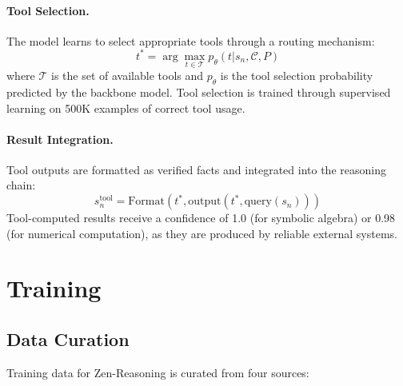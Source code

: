 \documentclass[11pt,a4paper]{article}
\begin{document}
\paragraph{Tool Selection.} The model learns to select appropriate tools through a routing mechanism:
\begin{equation}
    t^* = \arg\max_{t \in \mathcal{T}} p_\theta(t | s_n, \mathcal{C}, P)
\end{equation}
where $\mathcal{T}$ is the set of available tools and $p_\theta$ is the tool selection probability predicted by the backbone model. Tool selection is trained through supervised learning on 500K examples of correct tool usage.

\paragraph{Result Integration.} Tool outputs are formatted as verified facts and integrated into the reasoning chain:
\begin{equation}
    s_n^{\text{tool}} = \text{Format}(t^*, \text{output}(t^*, \text{query}(s_n)))
\end{equation}
Tool-computed results receive a confidence of 1.0 (for symbolic algebra) or 0.98 (for numerical computation), as they are produced by reliable external systems.

\section{Training}
\label{sec:training}

\subsection{Data Curation}
\label{sec:data}

Training data for Zen-Reasoning is curated from four sources:
\end{document}
